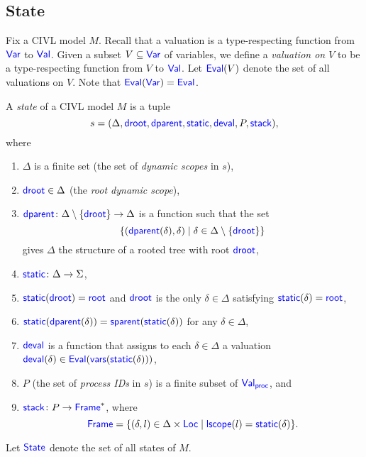 \documentclass[11pt]{article}
\begin{document}
\subsection{State}
\label{sec:state}

Fix a CIVL model $M$.  Recall that a valuation is a type-respecting
function from $\Var$ to $\Val$.  Given a subset $V\subseteq\Var$ of
variables, we define a \emph{valuation on $V$} to be a type-respecting
function from $V$ to $\Val$.  Let $\Eval(V)$ denote the set of all
valuations on $V$.  Note that $\Eval(\Var)=\Eval$.

\begin{definition}
  \label{def:state}
  A \emph{state} of a CIVL model $M$ is a tuple 
  \[
  s=(\Delta, \droot, \dparent, \static, \deval, P, \stack),
  \]
  where
  \begin{enumerate}
  \item $\Delta$ is a finite set (the set of \emph{dynamic scopes} in
    $s$),
  \item $\droot\in\Delta$ (the \emph{root dynamic scope}),
  \item $\dparent\colon \Delta\setminus\{\droot\}\ra\Delta$
    is a function such that the set 
    \[
    \{(\dparent(\delta),\delta)\mid \delta\in
    \Delta\setminus\{\droot\}\}
    \]
    gives $\Delta$ the structure of a rooted tree with root $\droot$,
    \item $\static\colon\Delta\ra\Sigma$,
  \item $\static(\droot)=\rootscope$ and $\droot$ is the only
    $\delta\in\Delta$ satisfying $\static(\delta)=\rootscope$,
  \item $\static(\dparent(\delta))=\sparent(\static(\delta))$ for any
    $\delta\in\Delta$,
  \item $\deval$ is a function that assigns to each $\delta\in\Delta$
    a valuation $\deval(\delta)\in\Eval(\vars(\static(\delta)))$,
  \item $P$ (the set of \emph{process IDs} in $s$) 
    is a finite subset of $\Val_{\proc}$, and
  \item $\stack\colon P\ra \Frame^*$, where
    \[
    \Frame=\{(\delta,l)\in\Delta\times\Loc\mid\lscope(l)=\static(\delta)\}.
    \]
  \end{enumerate}
  Let $\State$ denote the set of all states of $M$.
\end{definition}

\end{document}
